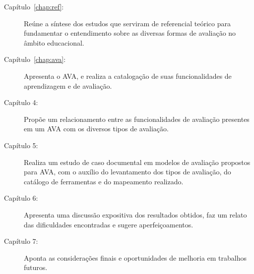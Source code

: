 \begin{description}
\item[Capítulo~\ref{chap:ref}:] Reúne a síntese dos estudos que serviram de referencial teórico para fundamentar o entendimento sobre as diversas formas de avaliação no âmbito educacional.
\item[Capítulo~\ref{chap:ava}:] Apresenta o \acrfull{AVA}, e realiza a catalogação de suas funcionalidades de aprendizagem e de avaliação.
\item[Capítulo 4:] Propõe um relacionamento entre as funcionalidades de avaliação presentes em um AVA com os diversos tipos de avaliação.
\item[Capítulo 5:] Realiza um estudo de caso documental em modelos de avaliação propostos para AVA, com o auxílio do levantamento dos tipos de avaliação, do catálogo de ferramentas e do mapeamento realizado.
\item[Capítulo 6:] Apresenta uma discussão expositiva dos resultados obtidos, faz um relato das dificuldades encontradas e sugere aperfeiçoamentos.
\item[Capítulo 7:] Aponta as considerações finais e oportunidades de melhoria em trabalhos futuros. 
\end{description}

